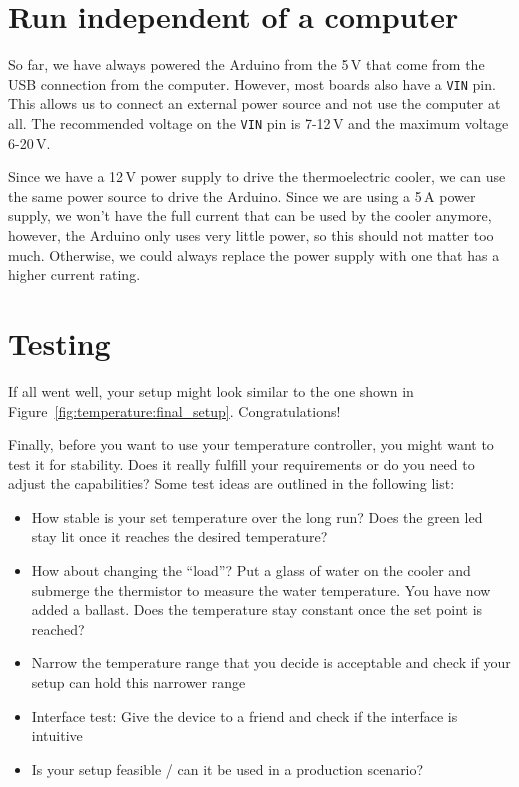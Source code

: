 \section{Run independent of a computer}\label{sec:complete_setup:vin}

So far, we have always powered the Arduino from the 5\,V that come from the USB connection from the computer. However, most boards also have a \texttt{VIN} pin. This allows us to connect an external power source and not use the computer at all.
The recommended voltage on the \texttt{VIN} pin is 7-12\,V and the maximum voltage 6-20\,V. 

Since we have a 12\,V power supply to drive the thermoelectric cooler, we can use the same power source to drive the Arduino. Since we are using a 5\,A power supply, we won't have the full current that can be used by the cooler anymore, however, the Arduino only uses very little power, so this should not matter too much. Otherwise, we could always replace the power supply with one that has a higher current rating.



\section{Testing}\label{sec:complete_setup:testing}

If all went well, your setup might look similar to the one shown in Figure~\ref{fig:temperature:final_setup}. Congratulations!

Finally, before you want to use your temperature controller, you might want to test it for stability. Does it really fulfill your requirements or do you need to adjust the capabilities? Some test ideas are outlined in the following list:
\begin{itemize}
    \item How stable is your set temperature over the long run?  Does the green \ac{led} stay lit once it reaches the desired temperature?
    \item How about changing the ``load''? Put a glass of water on the cooler and submerge the thermistor to measure the water temperature. You have now added a ballast. Does the temperature stay constant once the set point is reached?
    \item Narrow the temperature range that you decide is acceptable and check if your setup can hold this narrower range
    \item Interface test: Give the device to a friend and check if the interface is intuitive
    \item Is your setup feasible / can it be used in a production scenario?
\end{itemize}

